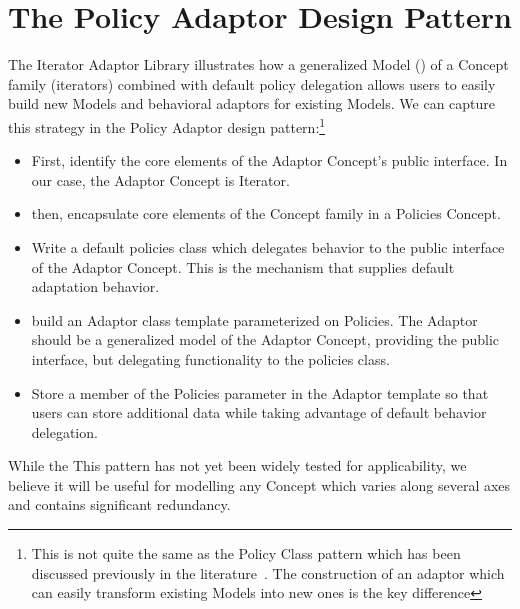 \documentclass{netobjectdays}
\newcommand{\iteratoradaptor}{\code{iterator\_\-adaptor}}
\begin{document}
\section{The Policy Adaptor Design Pattern}

The Iterator Adaptor Library illustrates how a generalized Model
(\iteratoradaptor{}) of a Concept family (iterators) combined with
default policy delegation allows users to easily build new Models and
behavioral adaptors for existing Models. We can capture this strategy
in the Policy Adaptor design pattern:\footnote{This is not quite the
same as the Policy Class pattern which has been discussed previously
in the literature~\cite{alexandrescu01:_modern_cpp_design}. The
construction of an adaptor which can easily transform existing Models
into new ones is the key difference}\begin{itemize}

 \item First, identify the core elements of the Adaptor Concept's
 public interface. In our case, the Adaptor Concept is Iterator.

 \item then, encapsulate core elements of the Concept family in a
Policies Concept.

 \item Write a default policies class which delegates behavior to the
public interface of the Adaptor Concept. This is the mechanism that
supplies default adaptation behavior.

 \item build an Adaptor class template parameterized on Policies. The
Adaptor should be a generalized model of the Adaptor Concept,
providing the public interface, but delegating functionality to the
policies class.

 \item Store a member of the Policies parameter in the Adaptor
template so that users can store additional data while taking
advantage of default behavior delegation.

\end{itemize}

While the This pattern has not yet been widely tested for
applicability, we believe it will be useful for modelling any Concept
which varies along several axes and contains significant
redundancy. 

\end{document}
